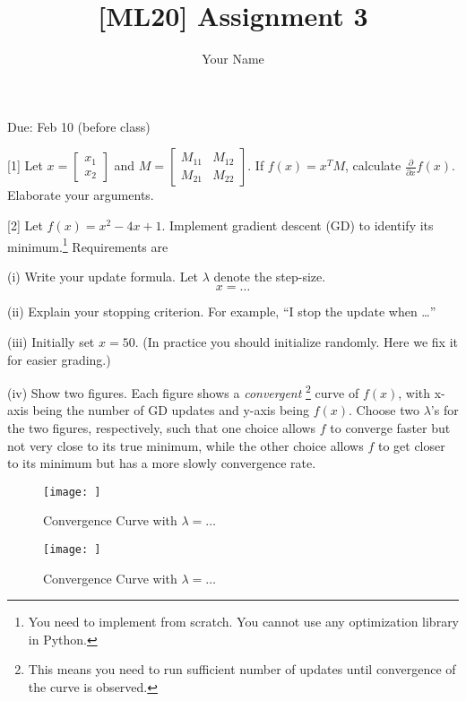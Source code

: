 \documentclass{llncs}
\title{[ML20] Assignment 3}
\author{Your Name}
\institute{}
\begin{document}
\maketitle 

\setlength\parindent{0pt} 
\setlength{\parskip}{10pt}

Due: Feb 10 (before class)

[1] Let $x = \begin{bmatrix} x_{1} \\ x_{2} \end{bmatrix}$ and 
$M = \begin{bmatrix} M_{11} & M_{12} \\ M_{21} & M_{22}
\end{bmatrix}$.  If $f(x) = x^{T} M$, 
calculate $\frac{\partial}{\partial x}f(x)$. Elaborate your 
arguments. 

\vspace{30pt}

[2] Let $f(x) = x^{2} - 4 x +1 $. Implement gradient 
descent (GD) to identify its minimum.\footnote{You need to 
implement from scratch. You cannot use any optimization 
library in Python.} Requirements are 

(i) Write your update formula. Let $\lambda$ denote the step-size. 
\begin{equation}
x = \ldots     
\end{equation}

(ii) Explain your stopping criterion. For example, ``I stop 
the update when \ldots'' 

(iii) Initially set $x = 50$. (In practice you should 
initialize randomly. Here we fix it for easier grading.)  

(iv) Show two figures. Each figure shows a \textit{convergent}
\footnote{This means you need to run sufficient number 
of updates until convergence of the curve is observed.}
curve of $f(x)$, with x-axis being the number of GD 
updates and y-axis being $f(x)$. 
Choose two $\lambda$'s for the two figures, respectively, 
such that one choice allows $f$ to converge faster but not 
very close to its true minimum, while the other choice allows 
$f$ to get closer to its minimum but has a more slowly 
convergence rate. 

\begin{figure}[h!] 
\centering 
\texttt{[image: ]} 
\caption{Convergence Curve with $\lambda = \ldots$} 
\end{figure}

\begin{figure}[h!] 
\centering 
\texttt{[image: ]} 
\caption{Convergence Curve with $\lambda = \ldots$} 
\end{figure}
\end{document}

